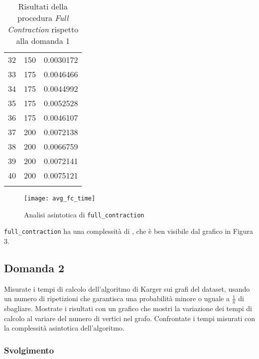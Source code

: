 \begin{center}
\begin{longtable}{|c|c|c|}
		32 & 150 & 0.0030172\\
		33 & 175 & 0.0046466\\
		34 & 175 & 0.0044992\\
		35 & 175 & 0.0052528\\
		36 & 175 & 0.0046107\\
		37 & 200 & 0.0072138\\
		38 & 200 & 0.0066759\\
		39 & 200 & 0.0072141\\
		40 & 200 & 0.0075121\\
		\hline
		\caption{Risultati della procedura \textit{Full Contraction} rispetto alla domanda 1}
		\label{fc-results}
	\end{longtable}
\end{center}\vspace{-40pt}

\begin{figure}[H]
	\centering
	\texttt{[image: avg\_fc\_time]}
	\caption{Analisi asintotica di \texttt{full\_contraction}}
	\label{fc-confronto}
\end{figure}

\texttt{full\_contraction} ha una complessità di , che è ben visibile dal grafico in Figura 3.

\subsection{Domanda 2}
Misurate i tempi di calcolo dell'algoritmo di Karger sui grafi del dataset, usando un numero di ripetizioni che garantisca una probabilità minore o uguale a $\frac{1}{n}$ di sbagliare. Mostrate i risultati con un grafico che mostri la variazione dei tempi di calcolo al variare del numero di vertici nel grafo. Confrontate i tempi misurati con la complessità asintotica dell'algoritmo.

\subsubsection{Svolgimento}
